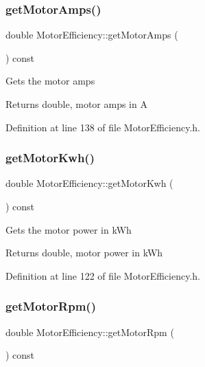 \subsubsection{\texorpdfstring{get\+Motor\+Amps()}{getMotorAmps()}}
{\footnotesize\ttfamily double Motor\+Efficiency\+::get\+Motor\+Amps (\begin{DoxyParamCaption}{ }\end{DoxyParamCaption}) const\hspace{0.3cm}{\ttfamily [inline]}}

Gets the motor amps \begin{DoxyReturn}{Returns}
double, motor amps in A 
\end{DoxyReturn}


Definition at line 138 of file Motor\+Efficiency.\+h.

\mbox{\label{class_motor_efficiency_a4d21d0c44ee00f5d097b0acbcb73a8d8}} 
\subsubsection{\texorpdfstring{get\+Motor\+Kwh()}{getMotorKwh()}}
{\footnotesize\ttfamily double Motor\+Efficiency\+::get\+Motor\+Kwh (\begin{DoxyParamCaption}{ }\end{DoxyParamCaption}) const\hspace{0.3cm}{\ttfamily [inline]}}

Gets the motor power in k\+Wh \begin{DoxyReturn}{Returns}
double, motor power in k\+Wh 
\end{DoxyReturn}


Definition at line 122 of file Motor\+Efficiency.\+h.

\mbox{\label{class_motor_efficiency_ab29655f487e90a73246be6e9bc67c36a}} 
\subsubsection{\texorpdfstring{get\+Motor\+Rpm()}{getMotorRpm()}}
{\footnotesize\ttfamily double Motor\+Efficiency\+::get\+Motor\+Rpm (\begin{DoxyParamCaption}{ }\end{DoxyParamCaption}) const\hspace{0.3cm}{\ttfamily [inline]}}

